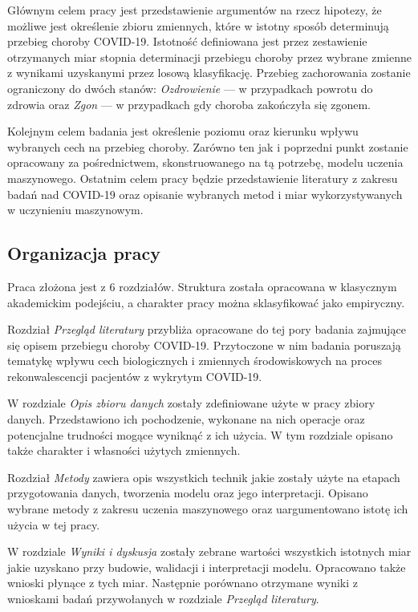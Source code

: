 \documentclass[polish, twoside, 12pt, a4paper]{article}
\theoremstyle{definition}
\theoremstyle{plain}
\theoremstyle{remark}
\begin{document}
Głównym celem pracy jest przedstawienie argumentów na rzecz hipotezy, że możliwe jest określenie zbioru zmiennych, które w istotny sposób determinują przebieg choroby COVID-19. Istotność definiowana jest przez zestawienie otrzymanych miar stopnia determinacji przebiegu choroby przez wybrane zmienne z wynikami uzyskanymi przez losową klasyfikację. Przebieg zachorowania zostanie ograniczony do dwóch stanów: \emph{Ozdrowienie} --- w przypadkach powrotu do zdrowia oraz \emph{Zgon} --- w przypadkach gdy choroba zakończyła się zgonem.

Kolejnym celem badania jest określenie poziomu oraz kierunku wpływu wybranych cech na przebieg choroby. Zarówno ten jak i poprzedni punkt zostanie opracowany za pośrednictwem, skonstruowanego na tą potrzebę, modelu uczenia maszynowego. Ostatnim celem pracy będzie przedstawienie literatury z zakresu badań nad COVID-19 oraz opisanie wybranych metod i miar wykorzystywanych w uczynieniu maszynowym. 

\subsection{Organizacja pracy}

Praca złożona jest z 6 rozdziałów. Struktura została opracowana w klasycznym akademickim podejściu, a charakter pracy można sklasyfikować jako empiryczny.

Rozdział \emph{Przegląd literatury} przybliża opracowane do tej pory badania zajmujące się opisem przebiegu choroby COVID-19. Przytoczone w nim badania poruszają tematykę wpływu cech biologicznych i zmiennych środowiskowych na proces rekonwalescencji pacjentów z wykrytym COVID-19.

W rozdziale \emph{Opis zbioru danych} zostały zdefiniowane użyte w pracy zbiory danych. Przedstawiono ich pochodzenie, wykonane na nich operacje oraz potencjalne trudności mogące wyniknąć z ich użycia. W tym rozdziale opisano także charakter i własności użytych zmiennych.

Rozdział \emph{Metody} zawiera opis wszystkich technik jakie zostały użyte na etapach przygotowania danych, tworzenia modelu oraz jego interpretacji. Opisano wybrane metody z zakresu uczenia maszynowego oraz uargumentowano istotę ich użycia w tej pracy.

W rozdziale \emph{Wyniki i dyskusja} zostały zebrane wartości wszystkich istotnych miar jakie uzyskano przy budowie, walidacji i interpretacji modelu. Opracowano także wnioski płynące z tych miar. Następnie porównano otrzymane wyniki z wnioskami badań przywołanych w rozdziale \emph{Przegląd literatury}.
\end{document}
